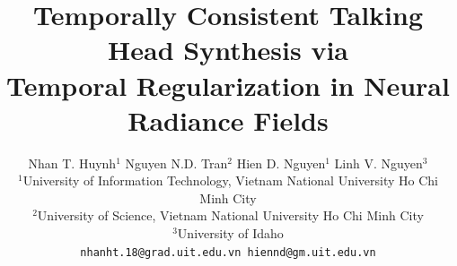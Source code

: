 \documentclass[10pt,twocolumn,letterpaper]{article}
\begin{document}
\title{Temporally Consistent Talking Head Synthesis via\\Temporal Regularization in Neural Radiance Fields}

\author{
Nhan T. Huynh$^{1}$ \quad Nguyen N.D. Tran$^{2}$ \quad Hien D. Nguyen$^{1}$ \quad Linh V. Nguyen$^{3}$\\[2pt]
$^{1}$University of Information Technology, Vietnam National University Ho Chi Minh City\\
$^{2}$University of Science, Vietnam National University Ho Chi Minh City\\
$^{3}$University of Idaho\\[2pt]
{\tt\small nhanht.18@grad.uit.edu.vn \quad hiennd@gm.uit.edu.vn}
}

\maketitle
\end{document}
